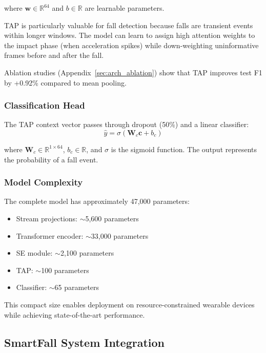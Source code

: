 where $\mathbf{w} \in \mathbb{R}^{64}$ and $b \in \mathbb{R}$ are learnable parameters.

TAP is particularly valuable for fall detection because falls are transient events within longer windows. The model can learn to assign high attention weights to the impact phase (when acceleration spikes) while down-weighting uninformative frames before and after the fall.

Ablation studies (Appendix~\ref{sec:arch_ablation}) show that TAP improves test F1 by +0.92\% compared to mean pooling.

\subsubsection{Classification Head}

The TAP context vector passes through dropout (50\%) and a linear classifier:
\begin{equation}
\hat{y} = \sigma(\mathbf{W}_c \mathbf{c} + b_c)
\label{eq:classifier}
\end{equation}

where $\mathbf{W}_c \in \mathbb{R}^{1 \times 64}$, $b_c \in \mathbb{R}$, and $\sigma$ is the sigmoid function. The output represents the probability of a fall event.

\subsubsection{Model Complexity}

The complete model has approximately 47,000 parameters:
\begin{itemize}
\item Stream projections: $\sim$5,600 parameters
\item Transformer encoder: $\sim$33,000 parameters
\item SE module: $\sim$2,100 parameters
\item TAP: $\sim$100 parameters
\item Classifier: $\sim$65 parameters
\end{itemize}

This compact size enables deployment on resource-constrained wearable devices while achieving state-of-the-art performance.

\subsection{SmartFall System Integration}
\label{sec:Arch}

